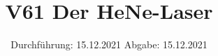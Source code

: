 

\subject{Fortgeschrittenenpraktikum}
\title{V61 Der HeNe-Laser}
\date{%
  Durchführung: 15.12.2021
  \hspace{3em}
  Abgabe: 15.12.2021
}



\maketitle
\thispagestyle{empty}
\tableofcontents
\newpage






%

\printbibliography{}




